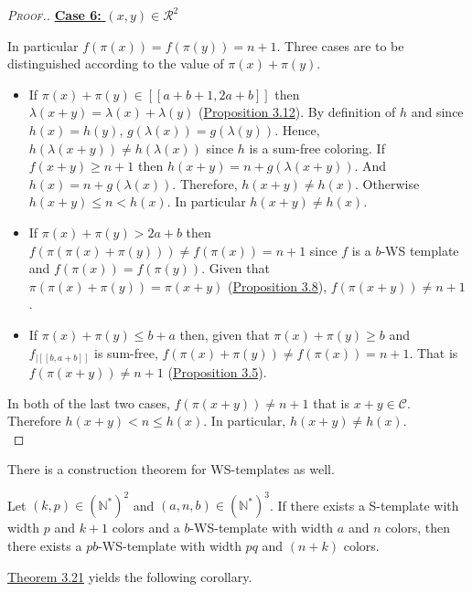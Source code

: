 \begin{proof}[\textsc{Proof.}]
\noindent \underline{\textbf{Case 6:} \((x,y) \in \mathcal{R}^2\)}
\par
In particular \(f(\pi(x)) = f(\pi(y))=n + 1\). Three cases are to be distinguished according to the value of \(\pi(x) + \pi(y)\).
\begin{itemize}
\item If \(\pi(x) + \pi(y) \in [\![a + b + 1, 2 a + b]\!]\) then \(\lambda(x + y) = \lambda(x) + \lambda(y)\)
	(\hyperref[prop7]{Proposition 3.12}). By definition of \(h\) and since \(h(x) = h(y)\), \(g(\lambda(x)) = g(\lambda(y))\).
	Hence, \(h(\lambda(x + y)) \neq h(\lambda(x))\) since \(h\) is a sum-free coloring. If \(f(x+y) \geqslant n + 1\)
	then \(h(x + y) = n + g(\lambda(x + y))\). And \(h(x) = n + g(\lambda(x))\). Therefore, \(h(x + y)  \neq h(x)\).
	Otherwise \(h(x+y) \leqslant n < h(x)\). In particular \(h(x + y) \neq h(x)\).
\item If \(\pi(x)+\pi(y)>2a+b\) then \(f(\pi(\pi(x)+\pi(y))) \neq f(\pi(x)) = n + 1\) since \(f\) is a \(b\)-WS template and
	\(f(\pi(x)) = f(\pi(y))\). Given that \(\pi(\pi(x)+\pi(y)) = \pi(x+y)\) (\hyperref[prop4]{Proposition 3.8}), \(f(\pi(x+y)) \neq n + 1\).
\item \begin{sloppypar}
	If \(\pi(x)+\pi(y)\leqslant b+a\) then, given that \(\pi(x)+\pi(y) \geqslant b\) and \(f_{| [\![b, a + b ]\!]}\) is
	sum-free, \({f(\pi(x) + \pi(y)) \neq f(\pi(x)) = n + 1}\). That is \({f(\pi(x + y)) \neq n + 1}\) (\hyperref[prop1]{Proposition 3.5}).
	\end{sloppypar}
\end{itemize}
\par
In both of the last two cases, \({f(\pi(x + y)) \neq n + 1}\) that is \(x+y \in \mathcal{C}\). Therefore \(h(x+y) < n \leqslant h(x)\).
In particular, \(h(x + y) \neq h(x)\). \\
\end{proof}

There is a construction theorem for WS-templates as well.

\begin{theorem}
\label{Theorem3.21}
Let \((k,p) \in (\mathbb{N}^*)^2\) and \((a, n, b) \in (\mathbb{N}^*)^3\). If there exists a S-template with width
\(p\) and \(k+1\) colors and a \(b\)-WS-template with width \(a\) and \(n\) colors, then there exists a \(pb\)-WS-template
with width \(pq\) and \((n+k)\) colors.
\end{theorem}

\hyperref[Theorem3.21]{Theorem 3.21} yields the following corollary.

